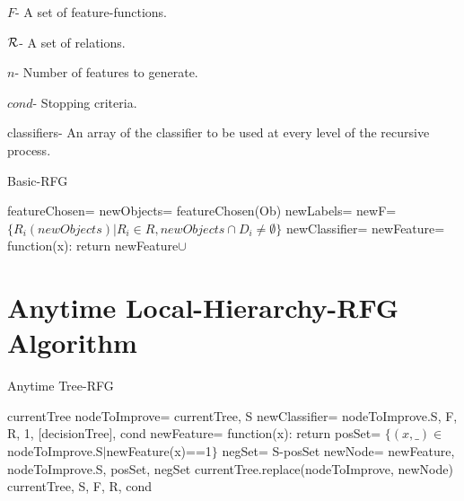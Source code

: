 \documentclass[12pt, a4paper]{article}
\theoremstyle{definition}
\begin{document}
\begin{appendices}
\begin{algorithm}[H]
$F$- A set of feature-functions.

$\cal R$- A set of relations.

$n$- Number of features to generate.

$cond$- Stopping criteria.

classifiers- An array of the classifier to be used at every level of the recursive process.

\caption{Basic-RFG}
\label{code2}
\begin{algorithmic}
    \State
    \Return {}
\EndIf
\State featureChosen= 
\State newObjects= featureChosen(Ob)
\State newLabels= 
\State newF= $\{R_{i}(newObjects)|R_{i}\in R, newObjects\cap D_{i}\neq\emptyset\}$
\State newClassifier= 
\State newFeature= function(x): return 
\State
\Return newFeature$\cup$ 
\EndFunction

\end{algorithmic}
\end{algorithm}

\section{Anytime Local-Hierarchy-RFG Algorithm} \label{app:3}
\begin{algorithm}[H]
\caption{Anytime Tree-RFG}
\label{code3}
\begin{algorithmic}
    \State
    \Return currentTree
\EndIf
\State nodeToImprove=  {currentTree, S}
\State newClassifier=  {nodeToImprove.S, F, R, 1, [decisionTree], cond}
\State newFeature= function(x): return 
\State posSet= $\{(x,\_)\in$ nodeToImprove.S$|$newFeature(x)==1$\}$
\State negSet= S-posSet
\State newNode=  {newFeature, nodeToImprove.S, posSet, negSet}
\State currentTree.replace(nodeToImprove, newNode)
\State
\Return {} {currentTree, S, F, R, cond}
\EndFunction

\end{algorithmic}
\end{algorithm}
\end{appendices}
\end{document}
